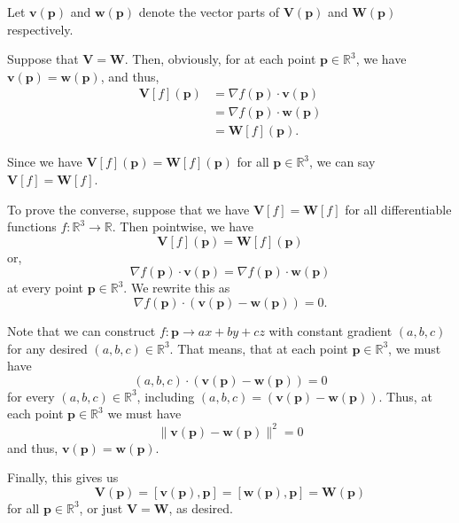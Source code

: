 \documentclass[12 pt, letterpaper]{hmcpset}
\begin{document}
\begin{solution}
	Let $\mathbf v(\mathbf p)$ and $\mathbf w(\mathbf p)$ denote the vector parts of $\mathbf V(\mathbf p)$ and $\mathbf W(\mathbf p)$ respectively. 

	Suppose that $\mathbf V = \mathbf W$. Then, obviously, for at each point $\mathbf p \in \mathbb R^3$, we have $\mathbf v(\mathbf p) = \mathbf w(\mathbf p)$, and thus, 
	\[
		\begin{split}
			\mathbf V[f](\mathbf p) & = \nabla f(\mathbf p) \cdot \mathbf v(\mathbf p) \\
						& = \nabla f(\mathbf p) \cdot \mathbf w(\mathbf p) \\
						& = \mathbf W[f](\mathbf p).
		\end{split}
	\] 

	Since we have $\mathbf V[f](\mathbf p) = \mathbf W[f](\mathbf p)$ for all $\mathbf p \in \mathbb R^3$, we can say $\mathbf V[f] = \mathbf W[f]$. 

	To prove the converse, suppose that we have $\mathbf V[f] = \mathbf W[f]$ for all differentiable functions $f : \mathbb R^3 \to \mathbb R$. Then pointwise, we have
	\[
		\mathbf V[f](\mathbf p) = \mathbf W[f](\mathbf p)
	\]
	or,
	\[
		\nabla f(\mathbf p) \cdot \mathbf v (\mathbf p) = \nabla f(\mathbf p) \cdot \mathbf w (\mathbf p)
	\]
	at every point $\mathbf p \in \mathbb R^3$. We rewrite this as
	\[
		\nabla f(\mathbf p) \cdot (\mathbf v(\mathbf p) - \mathbf w(\mathbf p)) = 0.
	\] 

	Note that we can construct $f : \mathbf p \to a x + b y + c z$ with constant gradient $(a, b, c)$ for any desired $(a, b, c) \in \mathbb R^3$. That means, that at each point $\mathbf p \in \mathbb R^3$, we must have
	\[
		(a, b, c) \cdot (\mathbf v(\mathbf p) - \mathbf w(\mathbf p)) = 0
	\]
	for every $(a, b, c) \in \mathbb R^3$, including $(a, b, c) = (\mathbf v(\mathbf p) - \mathbf w(\mathbf p))$. Thus, at each point $\mathbf p \in \mathbb R^3$ we must have
	\[
		\lVert \mathbf v(\mathbf p) - \mathbf w(\mathbf p) \rVert^2 = 0
	\]
	and thus, $\mathbf v(\mathbf p) = \mathbf w(\mathbf p)$.

	Finally, this gives us
	\[
		\mathbf V(\mathbf p) = [\mathbf v(\mathbf p), \mathbf p] = [\mathbf w(\mathbf p), \mathbf p] = \mathbf W(\mathbf p)
	\]
	for all $\mathbf p \in \mathbb R^3$, or just $\mathbf V = \mathbf W$, as desired.
\end{solution}
\end{document}
